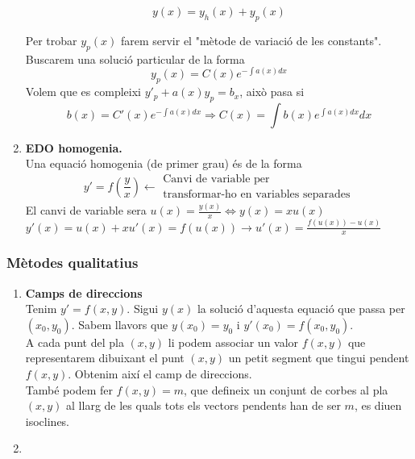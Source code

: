 \documentclass[../main.tex]{subfiles}
\begin{document}
\begin{enumerate}
\begin{corolari}
        \begin{displaymath}
            y(x) = y_h(x) + y_p(x)
        \end{displaymath}
    \end{corolari}
    Per trobar $y_p(x)$ farem servir el "mètode de variació de les constants".
    Buscarem una solució particular de la forma \begin{displaymath}
        y_p(x) = C(x)e^{-\int a(x) dx}
    \end{displaymath}
    Volem que es compleixi $y'_p + a(x)y_p = b_x$, això pasa si
    \begin{displaymath}
        b(x) = C'(x)e^{-\int a(x) dx} \Rightarrow C(x) = \int b(x)e^{\int a(x)dx}dx
    \end{displaymath}
    \item \textbf{EDO homogenia.}\\
    Una equació homogenia (de primer grau) és de la forma
    \begin{displaymath}
        y' = f\left(\frac{y}{x}\right) \leftarrow \substack{\text{Canvi de variable per}\\\text{transformar-ho en variables separades}}
    \end{displaymath}
    El canvi de variable sera $u(x) = \frac{y(x)}{x} \Leftrightarrow y(x) = xu(x)$\\
    $y'(x) = u(x) + xu'(x) = f(u(x)) \rightarrow u'(x) = \frac{f(u(x))-u(x)}{x}$
\end{enumerate}
\subsubsection{Mètodes qualitatius}
\begin{enumerate}
    \item \textbf{Camps de direccions}\\
    Tenim $y' = f(x,y)$. Sigui $y(x)$ la solució d'aquesta equació que passa per $(x_0, y_0)$. Sabem
    llavors que $y(x_0) = y_0$ i $y'(x_0) = f(x_0, y_0)$.\\
    A cada punt del pla $(x, y)$ li podem associar un valor $f(x,y)$ que representarem dibuixant el
    punt $(x,y)$ un petit segment que tingui pendent $f(x,y)$. Obtenim així el camp de direccions.\\
    També podem fer $f(x,y) = m$, que defineix un conjunt de corbes al pla $(x,y)$ al llarg de les
    quals tots els vectors pendents han de ser $m$, es diuen isoclines.
    \item 
\end{enumerate}
\end{document}
